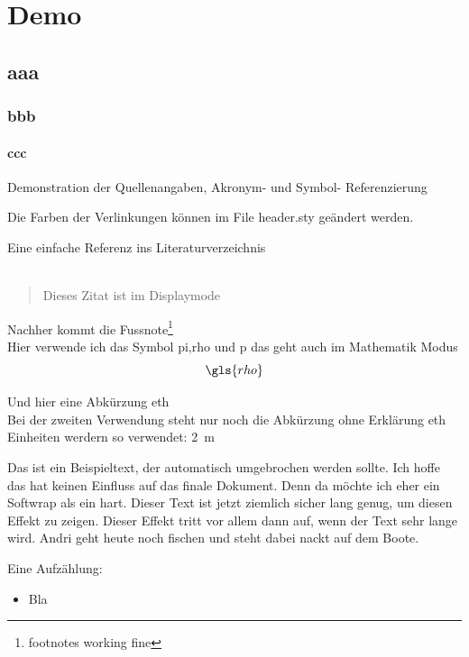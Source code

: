 \chapter{Demo}\label{chp:demo}
\section{aaa}\label{sec:aaa}
\subsection{bbb}
\subsubsection{ccc}


Demonstration der Quellenangaben, Akronym- und Symbol- Referenzierung

Die Farben der Verlinkungen können im File header.sty geändert werden.

Eine einfache Referenz ins Literaturverzeichnis\cite{einstein}\\

\\
\blockcquote{einstein}{Dieses Zitat ist im Displaymode}

Nachher kommt die Fussnote\footnote{footnotes working fine}\\

Hier verwende ich das Symbol \gls{pi},\gls{rho} und \gls{p} das geht auch im
Mathematik Modus \\

$$\gls{rho}$$

Und hier eine Abkürzung \gls{eth}\\
Bei der zweiten Verwendung steht nur noch die Abkürzung ohne Erklärung
\gls{eth}\\[5mm]

Einheiten werdern so verwendet: \SI{2}{m}

Das ist ein Beispieltext, der automatisch umgebrochen werden sollte. Ich hoffe
das hat keinen Einfluss auf das finale Dokument. Denn da möchte ich eher ein
Softwrap als ein hart. Dieser Text ist jetzt ziemlich sicher lang genug, um
diesen Effekt zu zeigen. Dieser Effekt tritt vor allem dann auf, wenn der Text
sehr lange wird. Andri geht heute noch fischen und steht dabei nackt auf dem
Boote.

Eine Aufzählung:
\begin{itemize}
    \item Bla
\end{itemize}


